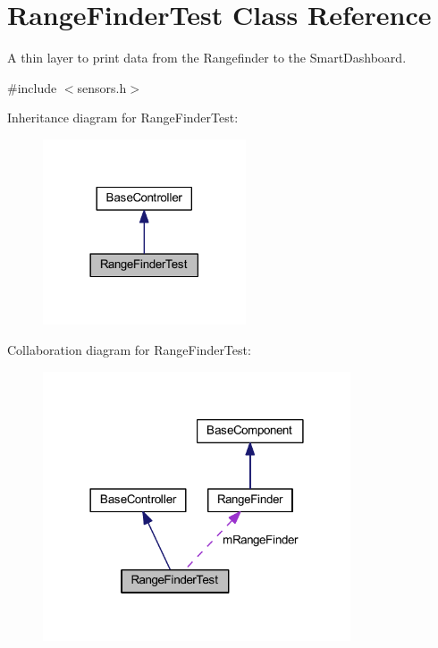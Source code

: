 \hypertarget{class_range_finder_test}{\section{\-Range\-Finder\-Test \-Class \-Reference}
\label{class_range_finder_test}
}


\-A thin layer to print data from the \-Rangefinder to the \-Smart\-Dashboard.  




{\ttfamily \#include $<$sensors.\-h$>$}



\-Inheritance diagram for \-Range\-Finder\-Test\-:\nopagebreak
\begin{figure}[H]
\begin{center}
\leavevmode
\includegraphics[width=170pt]{class_range_finder_test__inherit__graph}
\end{center}
\end{figure}


\-Collaboration diagram for \-Range\-Finder\-Test\-:\nopagebreak
\begin{figure}[H]
\begin{center}
\leavevmode
\includegraphics[width=258pt]{class_range_finder_test__coll__graph}
\end{center}
\end{figure}
